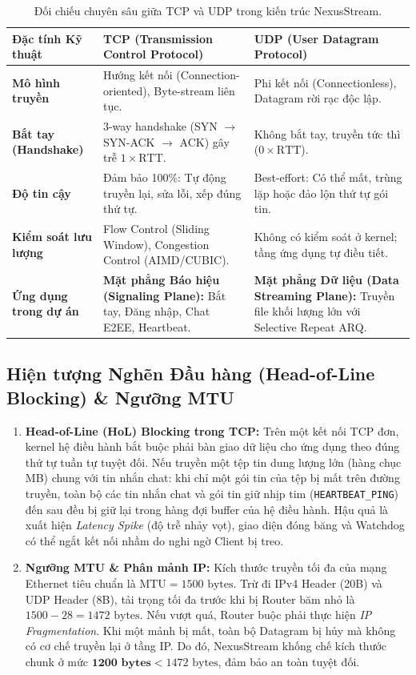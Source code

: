 \documentclass[11pt,a4paper]{article}
\begin{document}
\begin{table}[htbp]
\centering
\small
\begin{tabularx}{\textwidth}{p{3.2cm}Xp{5.5cm}}
\toprule
\rowcolor{headergray}
\textbf{Đặc tính Kỹ thuật} & \textbf{TCP (Transmission Control Protocol)} & \textbf{UDP (User Datagram Protocol)} \\
\midrule
\textbf{Mô hình truyền} & Hướng kết nối (Connection-oriented), Byte-stream liên tục. & Phi kết nối (Connectionless), Datagram rời rạc độc lập. \\
\textbf{Bắt tay (Handshake)} & 3-way handshake (SYN $\to$ SYN-ACK $\to$ ACK) gây trễ $1 \times \text{RTT}$. & Không bắt tay, truyền tức thì ($0 \times \text{RTT}$). \\
\textbf{Độ tin cậy} & Đảm bảo 100\%: Tự động truyền lại, sửa lỗi, xếp đúng thứ tự. & Best-effort: Có thể mất, trùng lặp hoặc đảo lộn thứ tự gói tin. \\
\textbf{Kiểm soát lưu lượng} & Flow Control (Sliding Window), Congestion Control (AIMD/CUBIC). & Không có kiểm soát ở kernel; tầng ứng dụng tự điều tiết. \\
\textbf{Ứng dụng trong dự án} & \textbf{Mặt phẳng Báo hiệu (Signaling Plane):} Bắt tay, Đăng nhập, Chat E2EE, Heartbeat. & \textbf{Mặt phẳng Dữ liệu (Data Streaming Plane):} Truyền file khối lượng lớn với Selective Repeat ARQ. \\
\bottomrule
\end{tabularx}
\caption{Đối chiếu chuyên sâu giữa TCP và UDP trong kiến trúc NexusStream.}
\label{tab:tcp_vs_udp}
\end{table}

\subsection{Hiện tượng Nghẽn Đầu hàng (Head-of-Line Blocking) \& Ngưỡng MTU}
\begin{enumerate}
    \item \textbf{Head-of-Line (HoL) Blocking trong TCP:} Trên một kết nối TCP đơn, kernel hệ điều hành bắt buộc phải bàn giao dữ liệu cho ứng dụng theo đúng thứ tự tuần tự tuyệt đối. Nếu truyền một tệp tin dung lượng lớn (hàng chục MB) chung với tin nhắn chat: khi chỉ một gói tin của tệp bị mất trên đường truyền, toàn bộ các tin nhắn chat và gói tin giữ nhịp tim (\texttt{HEARTBEAT\_PING}) đến sau đều bị giữ lại trong hàng đợi buffer của hệ điều hành. Hậu quả là xuất hiện \textit{Latency Spike} (độ trễ nhảy vọt), giao diện đóng băng và Watchdog có thể ngắt kết nối nhầm do nghi ngờ Client bị treo.
    \item \textbf{Ngưỡng MTU \& Phân mảnh IP:} Kích thước truyền tối đa của mạng Ethernet tiêu chuẩn là $\text{MTU} = 1500\text{ bytes}$. Trừ đi IPv4 Header (20B) và UDP Header (8B), tải trọng tối đa trước khi bị Router băm nhỏ là $1500 - 28 = 1472\text{ bytes}$. Nếu vượt quá, Router buộc phải thực hiện \textit{IP Fragmentation}. Khi một mảnh bị mất, toàn bộ Datagram bị hủy mà không có cơ chế truyền lại ở tầng IP. Do đó, NexusStream khống chế kích thước chunk ở mức $\mathbf{1200\text{ bytes}} < 1472\text{ bytes}$, đảm bảo an toàn tuyệt đối.
\end{enumerate}
\end{document}
